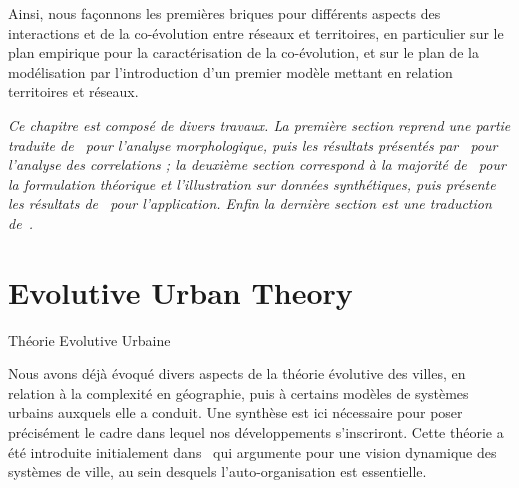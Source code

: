 Ainsi, nous façonnons les premières briques pour différents aspects des interactions et de la co-évolution entre réseaux et territoires, en particulier sur le plan empirique pour la caractérisation de la co-évolution, et sur le plan de la modélisation par l'introduction d'un premier modèle mettant en relation territoires et réseaux.






\stars


\textit{Ce chapitre est composé de divers travaux. La première section reprend une partie traduite de~\cite{raimbault2017calibration} pour l'analyse morphologique, puis les résultats présentés par~\cite{raimbault2016cautious} pour l'analyse des correlations ; la deuxième section correspond à la majorité de~\cite{raimbault2017identification} pour la formulation théorique et l'illustration sur données synthétiques, puis présente les résultats de~\cite{raimbault:halshs-01584914} pour l'application. Enfin la dernière section est une traduction de~\cite{raimbault2017indirect}.}





\newpage


\section*{Evolutive Urban Theory}{Théorie Evolutive Urbaine}



Nous avons déjà évoqué divers aspects de la théorie évolutive des villes, en relation à la complexité en géographie, puis à certains modèles de systèmes urbains auxquels elle a conduit. Une synthèse est ici nécessaire pour poser précisément le cadre dans lequel nos développements s'inscriront. Cette théorie a été introduite initialement dans~\cite{pumain1997pour} qui argumente pour une vision dynamique des systèmes de ville, au sein desquels l'auto-organisation est essentielle.


